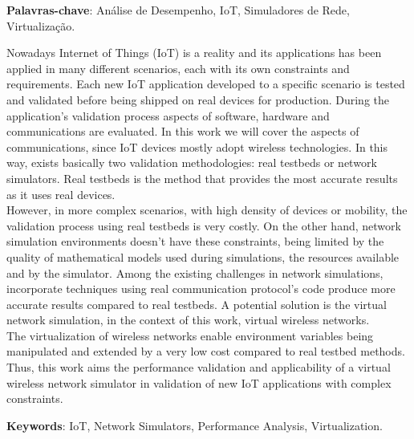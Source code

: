 \vspace{1.5ex}

{\bf Palavras-chave}: Análise de Desempenho, IoT, Simuladores de Rede, Virtualização.

%
%


Nowadays Internet of Things (IoT) is a reality and its applications has been applied in many different scenarios, each with its own constraints and requirements. Each new IoT application developed to a specific scenario is tested and validated before being shipped on real devices for production. During the application’s validation process aspects of software, hardware and communications are evaluated. In this work we will cover the aspects of communications, since IoT devices mostly adopt wireless technologies. In this way, exists basically two validation methodologies: real testbeds or network simulators. Real testbeds is the method that provides the most accurate results as it uses real devices. \\
However, in more complex scenarios, with high density of devices or mobility, the validation process using real testbeds is very costly. On the other hand, network simulation environments doesn’t have these constraints, being limited by the quality of mathematical models used during simulations, the resources available and by the simulator. Among the existing challenges in network simulations, incorporate techniques using real communication protocol’s code produce more accurate results compared to real testbeds. A potential solution is the virtual network simulation, in the context of this work, virtual wireless networks. 
\\
The virtualization of wireless networks enable environment variables being manipulated and extended by a very low cost compared to real testbed methods. Thus, this work aims the performance validation and applicability of a virtual wireless network simulator in validation of new IoT applications with complex constraints.

\vspace{1.5ex}

{\bf Keywords}: IoT, Network Simulators, Performance Analysis, Virtualization.
